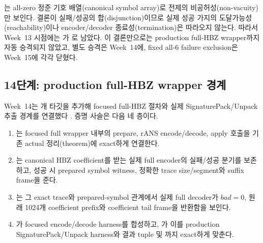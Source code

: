 는 all-zero 정준 기호
배열(canonical symbol array)로 전제의 비공허성(non-vacuity)만 보인다. 결론이
실패/성공의 합(disjunction)이므로 실제 성공 가지의 도달가능성(reachability)이나
encoder/decoder 종료성(termination)은 따라오지 않는다. 따라서
Week~13 시점에는 가
\statuspartial 로 남았다. 이 결론만으로는 production full-HBZ wrapper까지 자동
승격되지 않았고, 별도 승격은 Week~14에, fixed all-6 failure exclusion은
Week~15에 각각 닫혔다.

\subsection{14단계: production full-HBZ wrapper 경계}

Week~14는 \WeekFourteenTargetCount 개 타깃을 추가해 focused full-HBZ 절차와
실제 SignaturePack/Unpack 추출 경계를 연결했다
\cite{week14-report,hbz-full-wrapper-composition}. 증명 사슬은 다음 네 층이다.

\begin{enumerate}
  \item {}는 focused full wrapper 내부의
        prepare, rANS encode/decode, apply 호출을 기존 actual 정리(theorem)에
        exact하게 연결한다.
  \item {}는 canonical HBZ
        coefficient를 받는 실제 full encoder의 실패/성공 분기를 보존하고, 성공
        시 prepared symbol witness, 정확한 trace size/segment와 suffix frame을 준다.
  \item {}는 그 exact trace와
        prepared-symbol 관계에서 실제 full decoder가 \(bad=0\), 원래 1024개
        coefficient prefix와 coefficient tail frame을 반환함을 보인다.
  \item {}가 focused
        encode/decode harness를 합성하고,
        가 이를 production
        SignaturePack/Unpack harness와 결과 tuple 및 까지
        exact하게 맞춘다.
\end{enumerate}

